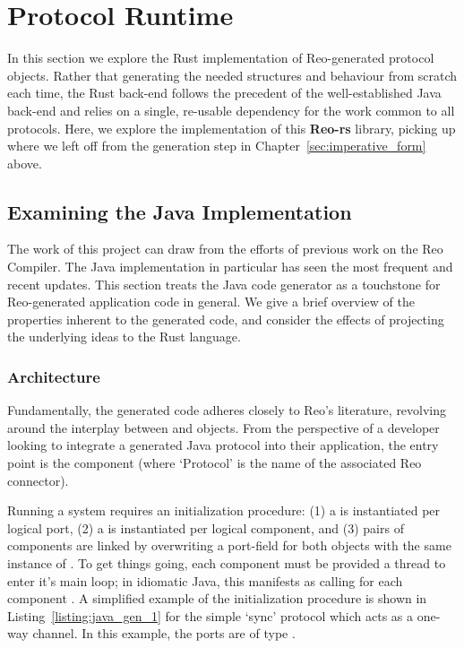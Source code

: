 \chapter{Protocol Runtime}
\label{sec:protocol_runtime}
In this section we explore the Rust implementation of Reo-generated protocol objects. Rather that generating the needed structures and behaviour from scratch each time, the Rust back-end follows the precedent of the well-established Java back-end and relies on a single, re-usable dependency for the work common to all protocols. Here, we explore the implementation of this \textbf{Reo-rs} library, picking up where we left off from the generation step in Chapter~\ref{sec:imperative_form} above.

\section{Examining the Java Implementation}
\label{sec:java_examined}
The work of this project can draw from the efforts of previous work on the Reo Compiler. The Java implementation in particular has seen the most frequent and recent updates. This section treats the Java code generator as a touchstone for Reo-generated application code in general. We give a brief overview of the properties inherent to the generated code, and consider the effects of projecting the underlying ideas to the Rust language.

\subsection{Architecture}
Fundamentally, the generated code adheres closely to Reo's literature, revolving around the interplay between  and  objects. From the perspective of a developer looking to integrate a generated Java protocol into their application, the entry point is the  component (where `Protocol' is the name of the associated Reo connector).

Running a system requires an initialization procedure: (1) a  is instantiated per logical port, (2) a  is instantiated per logical component, and (3) pairs of components are linked by overwriting a port-field for both objects with the same instance of . To get things going, each component must be provided a thread to enter it's main loop; in idiomatic Java, this manifests as calling  for each component . A simplified example of the initialization procedure is shown in Listing~\ref{listing:java_gen_1} for the simple `sync' protocol which acts as a one-way channel. In this example, the ports are of type .


